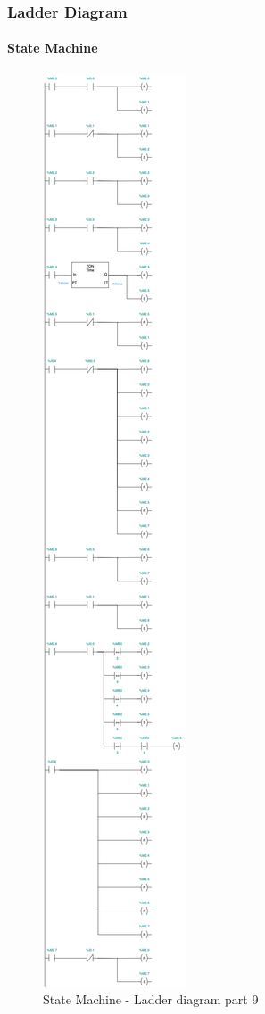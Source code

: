 \documentclass[12pt]{beamer}
\begin{document}
\begin{frame}
\frametitle{Ladder Diagram}
\framesubtitle{State Machine}
\begin{figure}
    \centering
    \includegraphics[trim={0 10cm 0 88cm}, clip, scale=.5]{img/Ladder_diagram_2.jpg}
    \caption{State Machine - Ladder diagram part 9}
    \label{fig:ladder29}
\end{figure}
\end{frame}
\end{document}
